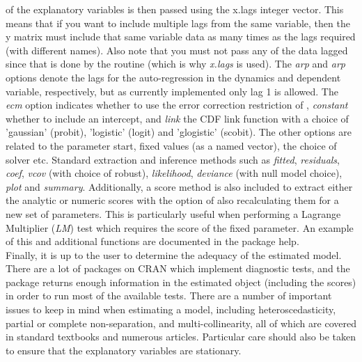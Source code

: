 of the explanatory variables is then passed using the x.lags integer vector. This means that if you want to include multiple lags from the same
variable, then the y matrix must include that same variable data as many times as the lags required (with different names). Also note that you must
not pass any of the data lagged since that is done by the routine (which is why \emph{x.lags} is used). The \emph{arp} and \emph{arp} options denote
the lags for the auto-regression in the dynamics and dependent variable, respectively, but as currently implemented only lag 1 is allowed. The \emph{ecm}
option indicates whether to use the error correction restriction of \cite{Nyberg2011}, \emph{constant} whether to include an intercept, and \emph{link}
the CDF link function with a choice of 'gaussian' (probit), 'logistic' (logit) and 'glogistic' (scobit). The other options are related to
the parameter start, fixed values (as a named vector), the choice of solver etc. Standard extraction and inference methods such as \emph{fitted}, \emph{residuals},
\emph{coef}, \emph{vcov} (with choice of robust), \emph{likelihood}, \emph{deviance} (with null model choice), \emph{plot} and \emph{summary}. Additionally,
a score method is also included to extract either the analytic or numeric scores with the option of also recalculating them for a new set of parameters.
This is particularly useful when performing a Lagrange Multiplier (\emph{LM}) test which requires the score of the fixed parameter. An example of this and
additional functions are documented in the package help.\\
Finally, it is up to the user to determine the adequacy of the estimated model. There are a lot of packages on CRAN which implement diagnostic tests, and
the \verb@dbm@ package returns enough information in the estimated object (including the scores) in order to run most of the available tests. There are a
number of important issues to keep in mind when estimating a model, including heteroscedasticity, partial or complete non-separation, and
multi-collinearity, all of which are covered in standard textbooks and numerous articles. Particular care should also be taken to ensure that
the explanatory variables are stationary.
